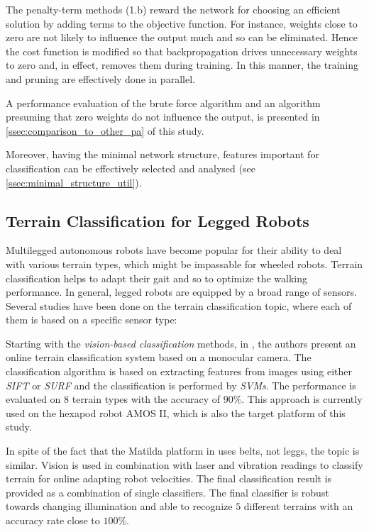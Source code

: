 The penalty-term methods (1.b) reward the network for choosing an efficient solution by adding terms to the objective function. For instance, weights close to zero are not likely to influence the output much and so can be eliminated. Hence the cost function is modified so that backpropagation drives unnecessary weights to zero and, in effect, removes them during training. In this manner, the training and pruning are effectively done in parallel.

A performance evaluation of the brute force algorithm and an algorithm presuming that zero weights do not influence the output, is presented in \cref{ssec:comparison_to_other_pa} of this study.

Moreover, having the minimal network structure, features important for classification can be effectively selected and analysed (see \cref{ssec:minimal_structure_util}). 

\subsection*{Terrain Classification for Legged Robots} \label{sec:soa_terrain_classification}
Multilegged autonomous robots have become popular for their ability to deal with various terrain types, which might be impassable for wheeled robots. Terrain classification helps to adapt their gait and so to optimize the walking performance. In general, legged robots are equipped by a broad range of sensors. Several studies have been done on the terrain classification topic, where each of them is based on a specific sensor type:

Starting with the \textit{vision-based classification} methods, in \citep{article:01:visual}, the authors present an online terrain classification system based on a monocular camera. The classification algorithm is based on extracting features from images using either \textit{SIFT} \citep{article:sift} or \textit{SURF} \citep{article:surf} and the classification is performed by \textit{SVMs}. The performance is evaluated on $ 8 $ terrain types with the accuracy of $ 90\% $. This approach is currently used on the hexapod robot AMOS II, which is also the target platform of this study.

In spite of the fact that the Matilda platform in \citep{article:04:onlinelearning} uses belts, not leggs, the topic is similar. Vision is used in combination with laser and vibration readings to classify terrain for online adapting robot velocities. The final classification result is provided as a combination of single classifiers. The final classifier is robust towards changing illumination and able to recognize $ 5 $ different terrains with an accuracy rate close to $ 100\% $.

